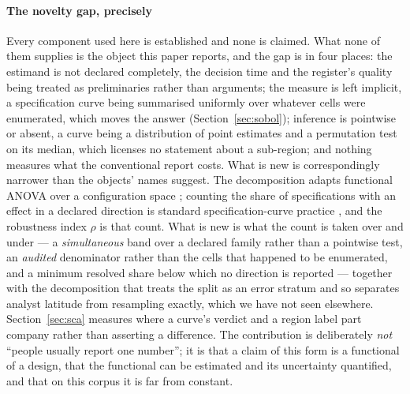 \documentclass[preprint,12pt,authoryear]{elsarticle}
\theoremstyle{definition}
\begin{document}
\paragraph{The novelty gap, precisely}
Every component used here is established and none is claimed. What none of
them supplies is the object this paper reports, and the gap is in four
places: the estimand is not declared completely, the decision time and the
register's quality being treated as preliminaries rather than arguments; the
measure is left implicit, a specification curve being summarised uniformly
over whatever cells were enumerated, which moves the answer
(Section~\ref{sec:sobol}); inference is pointwise or absent, a curve being a
distribution of point estimates and a permutation test on its median, which
licenses no statement about a sub-region; and nothing measures what the
conventional report costs. What is new is correspondingly narrower than the
objects' names suggest. The decomposition adapts functional ANOVA over a
configuration space \citep{hutter2014efficient}; counting the share of
specifications with an effect in a declared direction is standard
specification-curve practice \citep{simonsohn2020specification}, and the
robustness index $\rho$ is that count. What is new is what the count is
taken over and under --- a \emph{simultaneous} band over a declared family
rather than a pointwise test, an \emph{audited} denominator rather than the
cells that happened to be enumerated, and a minimum resolved share below
which no direction is reported --- together with the decomposition that
treats the split as an error stratum and so separates analyst latitude from
resampling exactly, which we have not seen elsewhere.
Section~\ref{sec:sca} measures where a curve's verdict and a region label part
company rather than asserting a difference. The contribution is deliberately
\emph{not} ``people usually report one number''; it is that a claim of this
form is a functional of a design, that the functional can be estimated and
its uncertainty quantified, and that on this corpus it is far from constant.
\end{document}

